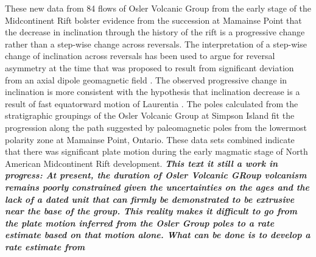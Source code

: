 \documentclass[draft,gc]{AGUTeX}
\begin{document}
\begin{article}
These new data from 84 flows of Osler Volcanic Group from the early stage of the Midcontinent Rift bolster evidence from the succession at Mamainse Point that the decrease in inclination through the history of the rift is a progressive change rather than a step-wise change across reversals. The interpretation of a step-wise change of inclination across reversals has been used to argue for reversal asymmetry at the time that was proposed to result from significant deviation from an axial dipole geomagnetic field \citep{Pesonen1981a}. The observed progressive change in inclination is more consistent with the hypothesis that inclination decrease is a result of fast equatorward motion of Laurentia \citep{Davis1997a, Swanson-Hysell2009a}. The poles calculated from the stratigraphic groupings of the Osler Volcanic Group at Simpson Island fit the progression along the path suggested by paleomagnetic poles from the lowermost polarity zone at Mamainse Point, Ontario. These data sets combined indicate that there was significant plate motion during the early magmatic stage of North American Midcontinent Rift development. \textit{\textbf{This text it still a work in progress: At present, the duration of Osler Volcanic GRoup volcanism remains poorly constrained given the uncertainties on the ages and the lack of a dated unit that can firmly be demonstrated to be extrusive near the base of the group. This reality makes it difficult to go from the plate motion inferred from the Osler Group poles to a rate estimate based on that motion alone. What can be done is to develop a rate estimate from}}



\end{article}
\end{document}
